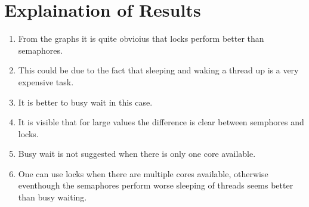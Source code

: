 \documentclass[a4paper,12pt]{report}
\begin{document}
\section{Explaination of Results}
\begin{enumerate}
\item From the graphs it is quite obvioius that locks perform better than semaphores.
\item This could be due to the fact that sleeping and waking a thread up is a very expensive task.
\item  It is better to busy wait in this case.
\item It is visible that for large values the difference is clear between semphores and locks.
\item Busy wait is not suggested when there is only one core available.
\item One can use locks when there are multiple cores available, otherwise eventhough the semaphores perform worse sleeping of threads seems better than busy waiting. 
\end{enumerate}
\end{document}
